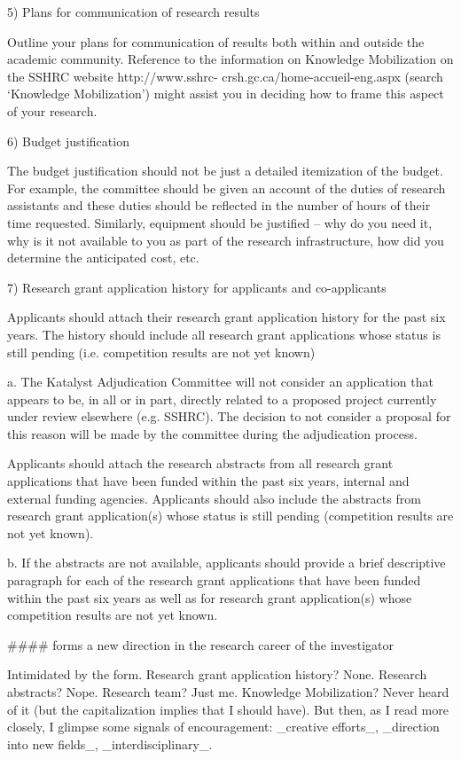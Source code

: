 5) Plans for communication of research results

Outline your plans for communication of results both within and outside the academic community.
Reference to the information on Knowledge Mobilization on the SSHRC website http://www.sshrc-
crsh.gc.ca/home-accueil-eng.aspx (search ‘Knowledge Mobilization’) might assist you in deciding
how to frame this aspect of your research.

6) Budget justification

The budget justification should not be just a detailed itemization of the budget. For example, the
committee should be given an account of the duties of research assistants and these duties should
be reflected in the number of hours of their time requested. Similarly, equipment should be
justified – why do you need it, why is it not available to you as part of the research infrastructure,
how did you determine the anticipated cost, etc.

7) Research grant application history for applicants and co-applicants

Applicants should attach their research grant application history for the past six years. The history
should include all research grant applications whose status is still pending (i.e. competition results
are not yet known)

a.
The Katalyst Adjudication Committee will not consider an application that appears to be, in all
or in part, directly related to a proposed project currently under review elsewhere (e.g.
SSHRC). The decision to not consider a proposal for this reason will be made by the
committee during the adjudication process.

Applicants should attach the research abstracts from all research grant applications that have been
funded within the past six years, internal and external funding agencies. Applicants should also
include the abstracts from research grant application(s) whose status is still pending (competition
results are not yet known).

b.
If the abstracts are not available, applicants should provide a brief descriptive paragraph for
each of the research grant applications that have been funded within the past six years as well
as for research grant application(s) whose competition results are not yet known.




#### forms a new direction in the research career of the investigator

Intimidated by the form.
Research grant application history? None. Research abstracts? Nope. Research team? Just me. Knowledge Mobilization? Never heard of it (but the capitalization implies that I should have). But then, as I read more closely, I glimpse some signals of encouragement: _creative efforts_, _direction into new fields_, _interdisciplinary_.


